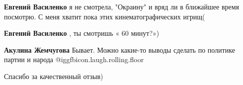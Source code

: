 \begin{itemize}
\begin{itemize} %
\textbf{Евгений Василенко} я не смотрела, "Окраину" и вряд ли в ближайшее время посмотрю. С меня хватит пока этих кинематографических игрищ(

\textbf{Евгений Василенко} , ты смотришь « 60 минут?»)

\textbf{Акулина Жемчугова} Бывает. Можно какие-то выводы сделать по политике партии и народа @igg{fbicon.laugh.rolling.floor} 
\end{itemize} %

Спасибо за качественный отзыв)

\end{itemize} %
